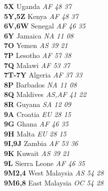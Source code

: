 ﻿\documentclass[landscape,a4paper]{article}
\begin{document}
\begin{multicols}{6}
\textbf{5X                      } Uganda                             \emph{ AF     48     37    } \\
\textbf{5Y,5Z                   } Kenya                              \emph{ AF     48     37    } \\
\textbf{6V,6W                   } Senegal                            \emph{ AF     46     35    } \\
\textbf{6Y                      } Jamaica                            \emph{ NA     11     08    } \\
\textbf{7O                      } Yemen                              \emph{ AS     39     21    } \\
\textbf{7P                      } Lesotho                            \emph{ AF     57     38    } \\
\textbf{7Q                      } Malawi                             \emph{ AF     53     37    } \\
\textbf{7T-7Y                   } Algeria                            \emph{ AF     37     33    } \\
\textbf{8P                      } Barbados                           \emph{ NA     11     08    } \\
\textbf{8Q                      } Maldives                           \emph{ AS,AF  41     22    } \\
\textbf{8R                      } Guyana                             \emph{ SA     12     09    } \\
\textbf{9A                      } Croatia                            \emph{ EU     28     15    } \\
\textbf{9G                      } Ghana                              \emph{ AF     46     35    } \\
\textbf{9H                      } Malta                              \emph{ EU     28     15    } \\
\textbf{9I,9J                   } Zambia                             \emph{ AF     53     36    } \\
\textbf{9K                      } Kuwait                             \emph{ AS     39     21    } \\
\textbf{9L                      } Sierra Leone                       \emph{ AF     46     35    } \\
\textbf{9M2,4                   } West Malaysia                      \emph{ AS     54     28    } \\
\textbf{9M6,8                   } East Malaysia                      \emph{ OC     54     28    } \\

\end{multicols}
\end{document}

